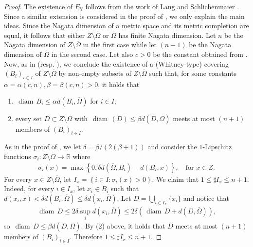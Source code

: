 \documentclass[reqno]{amsart}
\numberwithin{equation}{section}
\theoremstyle{remark}
\DeclareMathOperator{\diam}{diam}
\def\diam{{\mathop\mathrm{\,diam\,}}}
\begin{document}
\begin{proof}
The existence of $E_{\mathbb V}$ follows from the work of Lang and Schlichenmaier \cite{La:Sch:05}. Since a similar extension is considered in the proof of \cite[Theorem 5.2]{La:Sch:05}, we only explain the main ideas. Since the Nagata dimension of a metric space and its metric completion are equal, it follows that either $Z \setminus \overline{\Omega}$ or $\overline{\Omega}$ has finite Nagata dimension. Let $n$ be the Nagata dimension of $Z \setminus \overline{\Omega}$ in the first case while let $(n-1)$ be the Nagata dimension of $\overline{\Omega}$ in the second case. Let also $c > 0$ be the constant obtained from . Now, as in \cite[Proof of Theorem 1.5, p. 3652-3653]{La:Sch:05} (resp. \cite[Proof of Theorem 1.6, p. 3653-3654]{La:Sch:05}), we conclude the existence of a (Whitney-type) covering $( B_i )_{i \in I}$ of $Z \setminus \overline{\Omega}$  by non-empty subsets of $Z \setminus \overline{\Omega}$ such that, for some constants $\alpha = \alpha(c,n),\beta = \beta(c,n)>0$, it holds that
\begin{enumerate}
    \item $\diam B_i \leq \alpha d( B_i, \overline{\Omega} )$ for $i \in I$;
    \item every set $D \subset Z \setminus \overline{\Omega}$ with $\diam(D) \leq \beta d( D, \overline{\Omega} )$ meets at most $(n+1)$ members of $( B_i )_{ i \in I }$.
\end{enumerate}
As in the proof of \cite[Theorem 5.2]{La:Sch:05}, we let $\delta = \beta/ (2(\beta+1))$ and consider the $1$-Lipschitz functions $\sigma_i \colon Z \setminus \overline{\Omega} \rightarrow \mathbb{R}$ where
\begin{align*}
    \sigma_i(x) = \max\left\{ 0, \delta d( \overline{\Omega}, B_i ) - d( B_i, x ) \right\}, \quad\text{for $x \in Z$.}
\end{align*}
For every $x \in Z \setminus \overline{\Omega}$, let $I_x = \left\{ i \in I \colon \sigma_i(x) > 0 \right\}$. We claim that  $1 \leq \sharp I_x \leq n+1$. Indeed, for every $i \in I_x$, let $x_i \in B_i$ such that $d( x_i, x ) < \delta d( B_i, \overline{\Omega} ) \leq \delta d( x_i, \overline{\Omega} )$. Let $D = \bigcup_{ i \in I_x } \{x_i\}$ and notice that
\begin{align*}
    \diam D \leq 2\delta \sup_{ i } d( x_i, \overline{\Omega} ) \leq 2\delta( \diam D + d( D, \overline{\Omega} ) ),
\end{align*}
so $\diam D \leq \beta d ( D, \overline{\Omega} )$. By (2) above, it holds that $D$ meets at most $(n+1)$ members of $( B_i )_{ i \in I }$. Therefore $1 \leq \sharp I_x \leq n+1$. 


\end{proof}
\end{document}
